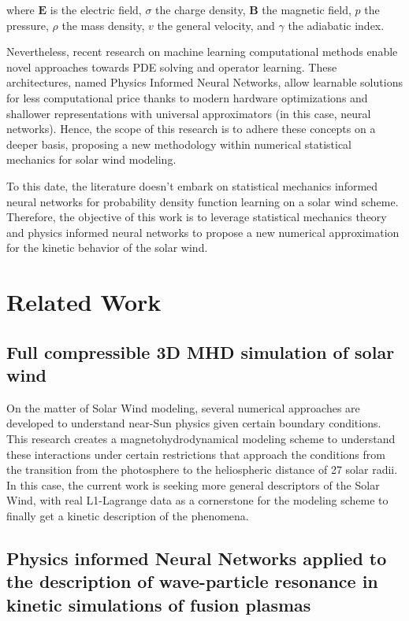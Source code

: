 \documentclass[12pt]{article}
\begin{document}
where $\mathbf{E}$ is the electric field, $\sigma$ the charge density, $\mathbf{B}$ the magnetic field, $p$ the pressure, $\rho$ the mass density, $v$ the general velocity, and $\gamma $ the adiabatic index.

Nevertheless, recent research on machine learning computational methods enable novel approaches towards PDE solving and operator learning. These architectures, named Physics Informed Neural Networks, allow learnable solutions for less computational price thanks to modern hardware optimizations and shallower representations with universal approximators (in this case, neural networks). Hence, the scope of this research is to adhere these concepts on a deeper basis, proposing a new methodology within numerical statistical mechanics for solar wind modeling.

To this date, the literature doesn't embark on statistical mechanics informed neural networks for probability density function learning on a solar wind scheme. Therefore, the objective of this work is to leverage statistical mechanics theory and physics informed neural networks to propose a new numerical approximation for the kinetic behavior of the solar wind.

\section{Related Work}

\subsection{Full compressible 3D MHD simulation of solar wind}
On the matter of Solar Wind modeling, several numerical approaches are developed to understand near-Sun physics given certain boundary conditions. This research \cite{windmodelling1} creates a magnetohydrodynamical modeling scheme to understand these interactions under certain restrictions that approach the conditions from the transition from the photosphere to the heliospheric distance of 27 solar radii. In this case, the current work is seeking more general descriptors of the Solar Wind, with real L1-Lagrange data as a cornerstone for the modeling scheme to finally get a kinetic description of the phenomena.

\subsection{Physics informed Neural Networks applied to the description of wave-particle resonance in kinetic simulations of fusion plasmas}
\end{document}
